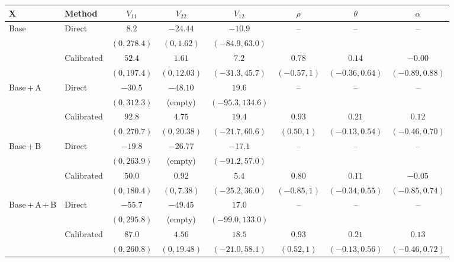 \begin{tabular}{@{}llcccccc@{}}
\toprule
\(\bm X\) & Method & \(V_{11}\) & \(V_{22}\) & \(V_{12}\) & \(\rho\) & \(\theta\) & \(\alpha\)\\
\midrule
Base & Direct & $8.2$ & $-24.44$ & $-10.9$ & -- & -- & -- \\
 &  & $(0, 278.4)$ & $(0, 1.62)$ & $(-84.9, 63.0)$ &  &  &  \\
 & Calibrated & $52.4$ & $1.61$ & $7.2$ & $0.78$ & $0.14$ & $-0.00$ \\
 &  & $(0, 197.4)$ & $(0, 12.03)$ & $(-31.3, 45.7)$ & $(-0.57, 1)$ & $(-0.36, 0.64)$ & $(-0.89, 0.88)$ \\
\addlinespace
Base\,+\,A & Direct & $-30.5$ & $-48.10$ & $19.6$ & -- & -- & -- \\
 &  & $(0, 312.3)$ & (empty) & $(-95.3, 134.6)$ &  &  &  \\
 & Calibrated & $92.8$ & $4.75$ & $19.4$ & $0.93$ & $0.21$ & $0.12$ \\
 &  & $(0, 270.7)$ & $(0, 20.38)$ & $(-21.7, 60.6)$ & $(0.50, 1)$ & $(-0.13, 0.54)$ & $(-0.46, 0.70)$ \\
\addlinespace
Base\,+\,B & Direct & $-19.8$ & $-26.77$ & $-17.1$ & -- & -- & -- \\
 &  & $(0, 263.9)$ & (empty) & $(-91.2, 57.0)$ &  &  &  \\
 & Calibrated & $50.0$ & $0.92$ & $5.4$ & $0.80$ & $0.11$ & $-0.05$ \\
 &  & $(0, 180.4)$ & $(0, 7.38)$ & $(-25.2, 36.0)$ & $(-0.85, 1)$ & $(-0.34, 0.55)$ & $(-0.85, 0.74)$ \\
\addlinespace
Base\,+\,A\,+\,B & Direct & $-55.7$ & $-49.45$ & $17.0$ & -- & -- & -- \\
 &  & $(0, 295.8)$ & (empty) & $(-99.0, 133.0)$ &  &  &  \\
 & Calibrated & $87.0$ & $4.56$ & $18.5$ & $0.93$ & $0.21$ & $0.13$ \\
 &  & $(0, 260.8)$ & $(0, 19.48)$ & $(-21.0, 58.1)$ & $(0.52, 1)$ & $(-0.13, 0.56)$ & $(-0.46, 0.72)$ \\
\bottomrule
\end{tabular}
